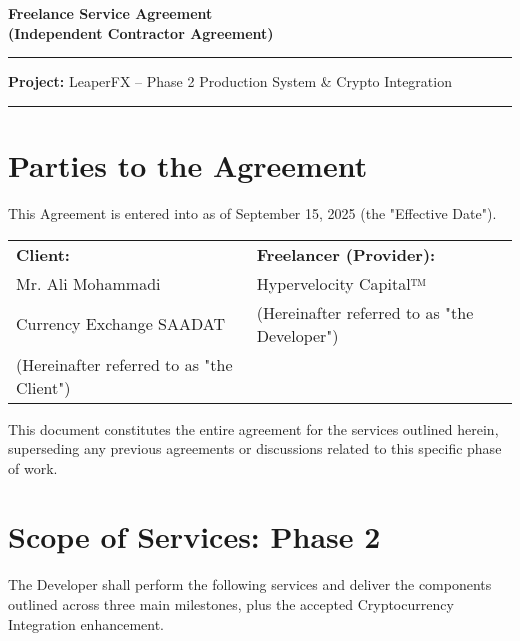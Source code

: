 \documentclass[11pt, a4paper]{article}
\begin{document}
\begin{center}
    \vspace*{1cm}
    {\huge\bfseries\color{primary} Freelance Service Agreement} \\
    {\Large\bfseries\color{secondary} (Independent Contractor Agreement)} \\
    \vspace{0.5cm}
    \hrule
    \vspace{0.2cm}
    {\large \textbf{Project:} LeaperFX -- Phase 2 Production System \& Crypto Integration} \\
    \vspace{0.2cm}
    \hrule
    \vspace{1cm}
\end{center}

\section*{Parties to the Agreement}

This Agreement is entered into as of September 15, 2025 (the "Effective Date").

\begin{tabularx}{\textwidth}{@{} X X @{}}
    \textbf{Client:} & \textbf{Freelancer (Provider):} \\
    Mr. Ali Mohammadi & Hypervelocity Capital™ \\
    Currency Exchange SAADAT & (Hereinafter referred to as "the Developer") \\
    (Hereinafter referred to as "the Client") & \\
\end{tabularx}

\vspace{1cm}

This document constitutes the entire agreement for the services outlined herein, superseding any previous agreements or discussions related to this specific phase of work.

\section{Scope of Services: Phase 2}
The Developer shall perform the following services and deliver the components outlined across three main milestones, plus the accepted Cryptocurrency Integration enhancement.
\end{document}
